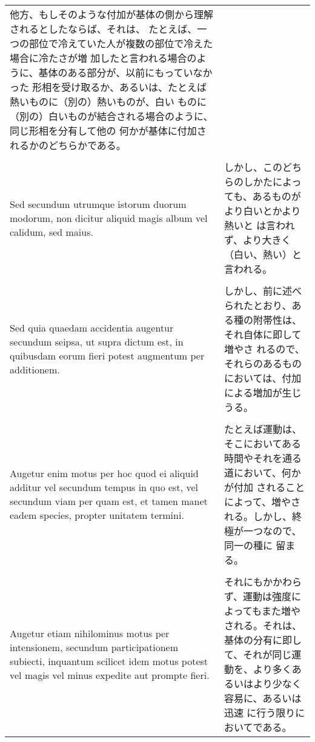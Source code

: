 \documentclass[10pt]{jsarticle} %
\begin{document}
\begin{longtable}{p{21em}p{21em}}
他方、もしそのような付加が基体の側から理解されるとしたならば、それは、
たとえば、一つの部位で冷えていた人が複数の部位で冷えた場合に冷たさが増
加したと言われる場合のように、基体のある部分が、以前にもっていなかった
形相を受け取るか、あるいは、たとえば熱いものに（別の）熱いものが、白い
ものに（別の）白いものが結合される場合のように、同じ形相を分有して他の
何かが基体に付加されるかのどちらかである。


\\\\


Sed secundum utrumque istorum
duorum modorum, non dicitur aliquid magis album vel calidum, sed
maius. 

&

しかし、このどちらのしかたによっても、あるものがより白いとかより熱いと
は言われず、より大きく（白い、熱い）と言われる。

\\\\

Sed quia quaedam accidentia augentur secundum seipsa, ut supra
dictum est, in quibusdam eorum fieri potest augmentum per
additionem. 

&

しかし、前に述べられたとおり、ある種の附帯性は、それ自体に即して増やさ
 れるので、それらのあるものにおいては、付加による増加が生じうる。


\\\\


Augetur enim motus per hoc quod ei aliquid additur vel
secundum tempus in quo est, vel secundum viam per quam est, et tamen
manet eadem species, propter unitatem termini. 


&

たとえば運動は、そこにおいてある時間やそれを通る道において、何かが付加
されることによって、増やされる。しかし、終極が一つなので、同一の種に
留まる。

\\\\

Augetur etiam
nihilominus motus per intensionem, secundum participationem subiecti,
inquantum scilicet idem motus potest vel magis vel minus expedite aut
prompte fieri. 


&

それにもかかわらず、運動は強度によってもまた増やされる。それは、基体の分有に即し
 て、それが同じ運動を、より多くあるいはより少なく容易に、あるいは迅速
 に行う限りにおいてである。



\end{longtable}
\end{document}
